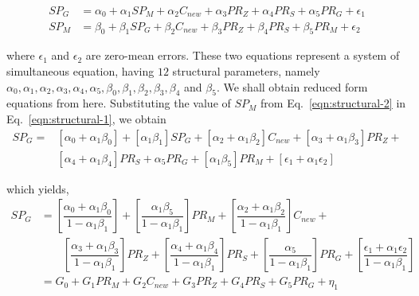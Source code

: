 \documentclass[11pt, a4paper]{article}
\begin{document}
\begin{align}
    SP_{G} & =\alpha_{0}+\alpha_{1}SP_{M}+\alpha_{2}C_{new}+\alpha_{3}PR_{Z}+\alpha_{4}PR_{S}+\alpha_{5}PR_{G}+\epsilon_{1} \label{eqn:structural-1} \\
    SP_{M} & =\beta_{0}+\beta_{1}SP_{G}+\beta_{2}C_{new}+\beta_{3}PR_{Z}+\beta_{4}PR_{S}+\beta_{5}PR_{M}+\epsilon_{2} \label{eqn:structural-2}
\end{align}

\noindent where $\epsilon_{1}$ and $\epsilon_{2}$ are zero-mean errors. These two equations represent a system of simultaneous equation, having $12$ structural parameters, namely $\alpha_{0}, \alpha_{1}, \alpha_{2}, \alpha_{3}, \alpha_{4}, \alpha_{5}, \beta_{0}, \beta_{1}, \beta_{2}, \beta_{3}, \beta_{4}$ and $\beta_{5}$. We shall obtain reduced form equations from here. Substituting the value of $SP_M$ from Eq.~\eqref{eqn:structural-2} in Eq.~\eqref{eqn:structural-1}, we obtain
%
\begin{align*}
    SP_{G} = & \left[\alpha_{0}+\alpha_{1}\beta_{0}\right]+\left[\alpha_{1}\beta_{1}\right]SP_{G}+\left[\alpha_{2}+\alpha_{1}\beta_{2}\right]C_{new}+\left[\alpha_{3}+\alpha_{1}\beta_{3}\right]PR_{Z}+\\
    & \left[\alpha_{4}+\alpha_{1}\beta_{4}\right]PR_{S}  +\alpha_{5}PR_{G}+\left[\alpha_{1}\beta_{5}\right]PR_{M}+\left[\epsilon_{1}+\alpha_{1}\epsilon_{2}\right]
\end{align*}

\noindent which yields,
%
\begin{align*}
    SP_{G} &  = \left[\dfrac{\alpha_{0}+\alpha_{1}\beta_{0}}{1-\alpha_{1}\beta_{1}}\right]+\left[\dfrac{\alpha_{1}\beta_{5}}{1-\alpha_{1}\beta_{1}}\right]PR_{M}+\left[\dfrac{\alpha_{2}+\alpha_{1}\beta_{2}}{1-\alpha_{1}\beta_{1}}\right]C_{new}+\\
    & \qquad \left[\dfrac{\alpha_{3}+\alpha_{1}\beta_{3}}{1-\alpha_{1}\beta_{1}}\right]PR_{Z}+\left[\dfrac{\alpha_{4}+\alpha_{1}\beta_{4}}{1-\alpha_{1}\beta_{1}}\right]PR_{S}  +\left[\dfrac{\alpha_{5}}{1-\alpha_{1}\beta_{1}}\right]PR_{G}+\left[\dfrac{\epsilon_{1}+\alpha_{1}\epsilon_{2}}{1-\alpha_{1}\beta_{1}}\right] \\
    & = G_{0}+G_{1}PR_{M}+G_{2}C_{new}+G_{3}PR_{Z}+G_{4}PR_{S}+G_{5}PR_{G}+\eta_{1}
\end{align*}
\end{document}
